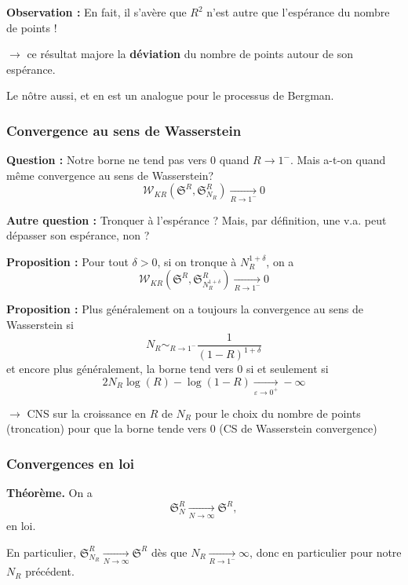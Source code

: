 \documentclass[9pt]{beamer}
\begin{document}
\begin{frame}
    \textbf{Observation :} En fait, il s'avère que $ R^2 $ n'est autre que l'espérance du nombre de points !

    \begin{center}

    $ \rightarrow $ ce résultat majore la \textbf{déviation} du nombre de points autour de son espérance. 

    Le nôtre aussi, et en est un analogue pour le processus de Bergman.

    \end{center}

\end{frame}\begin{frame}\frametitle{Convergence au sens de Wasserstein}

    \textbf{Question :} Notre borne ne tend pas vers $0$ quand $ R \to 1^-$. Mais a-t-on quand même convergence au sens de Wasserstein?
    \[ 
        \mathcal W_{KR} ( \mathfrak S^R, \mathfrak S^R_{N_R}) \xrightarrow[R \to 1^-]{} 0
    \]

    \textbf{Autre question :} Tronquer à l'espérance ? Mais, par définition, une v.a. peut dépasser son espérance, non ?

    \textbf{Proposition :} Pour tout $ \delta > 0 $, si on tronque à $ N_R^{1+\delta} $, on a 
    \[ 
        \mathcal W_{KR} ( \mathfrak S^R, \mathfrak S^R_{N_R^{1+\delta}}) \xrightarrow[R \to 1^-]{} 0
    \]

    \textbf{Proposition :} Plus généralement on a toujours la convergence au sens de Wasserstein si
    \[
        N_R \sim_{R \to 1^-} \frac{1}{(1-R)^{1+\delta}} 
    \]
    et encore plus généralement, la borne tend vers 0 si et seulement si
    \[ 
        2N_R  \log(R) - \log(1-R) \xrightarrow[\varepsilon \to 0^+]{} - \infty 
    \]
    \begin{center} 
        $ \rightarrow $ CNS sur la croissance en $R$ de $ N_R $ pour le choix du nombre de points (troncation) pour que la borne tende vers $0$ (CS de Wasserstein convergence) 
    \end{center}

\end{frame}\begin{frame}\frametitle{Convergences en loi}

    \textbf{Théorème.} On a 
    \[
    \mathfrak{S}_N^R \xrightarrow[N \to \infty]{} \mathfrak{S}^R,
    \]
    en loi.

    \bigskip
    
    En particulier, $ \mathfrak{S}_{N_R}^R \xrightarrow[N \to \infty]{} \mathfrak{S}^R $ dès que $ N_R \xrightarrow[R \to 1^-]{} \infty$, donc en particulier pour notre $ N_R$ précédent.


\end{frame}
\end{document}
